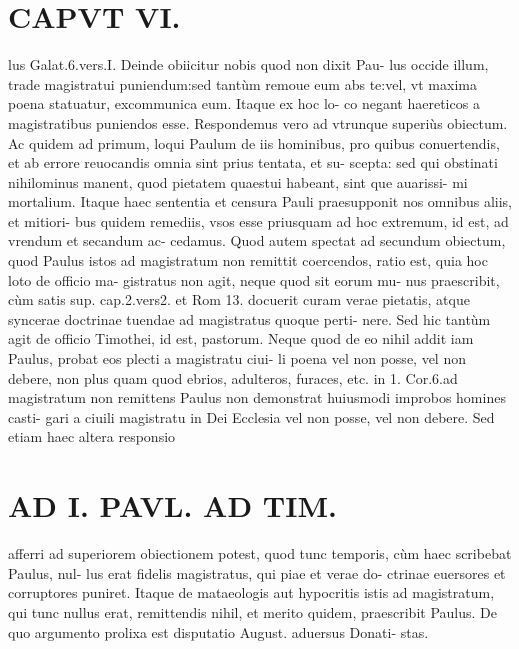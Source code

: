 \documentclass{article}
\begin{document}
\begin{pages}
\section*{CAPVT  VI. }
\marginpar{[ p.433 ]}\pstart lus Galat.6.vers.I.  \pend\pstart Deinde obiicitur nobis quod non dixit Pau- lus occide illum, trade magistratui puniendum:sed tantùm remoue eum abs te:vel, vt maxima poena statuatur, excommunica eum. Itaque ex hoc lo- co negant haereticos a magistratibus puniendos esse. Respondemus vero ad vtrunque superiùs obiectum. Ac quidem ad primum, loqui Paulum de iis hominibus, pro quibus conuertendis, et ab errore reuocandis omnia sint prius tentata, et su- scepta: sed qui obstinati nihilominus manent, quod pietatem quaestui habeant, sint que auarissi- mi mortalium. Itaque haec sententia et censura Pauli praesupponit nos omnibus aliis, et mitiori- bus quidem remediis, vsos esse priusquam ad hoc extremum, id est, ad vrendum et secandum ac- cedamus.  \pend\pstart Quod autem spectat ad secundum obiectum, quod Paulus istos ad magistratum non remittit coercendos, ratio est, quia hoc loto de officio ma- gistratus non agit, neque quod sit eorum mu- nus praescribit, cùm satis sup. cap.2.vers2. et Rom 13. docuerit curam verae pietatis, atque syncerae doctrinae tuendae ad magistratus quoque perti- nere. Sed hic tantùm agit de officio Timothei, id est, pastorum. Neque quod de eo nihil addit iam Paulus, probat eos plecti a magistratu ciui- li poena vel non posse, vel non debere, non plus quam quod ebrios, adulteros, furaces, etc. in 1. Cor.6.ad magistratum non remittens Paulus non demonstrat huiusmodi improbos homines casti- gari a ciuili magistratu in Dei Ecclesia vel non posse, vel non debere. Sed etiam haec altera responsio  \pend
\section*{AD I. PAVL. AD TIM. }
\marginpar{[ p.150 ]}\pstart afferri ad superiorem obiectionem potest, quod tunc temporis, cùm haec scribebat Paulus, nul- lus erat fidelis magistratus, qui piae et verae do- ctrinae euersores et corruptores puniret. Itaque  de mataeologis aut hypocritis istis ad magistratum, qui tunc nullus erat, remittendis nihil, et merito quidem, praescribit Paulus. De quo argumento prolixa est disputatio August. aduersus Donati- stas.  \pend
{}
{}

\end{pages}
\end{document}
